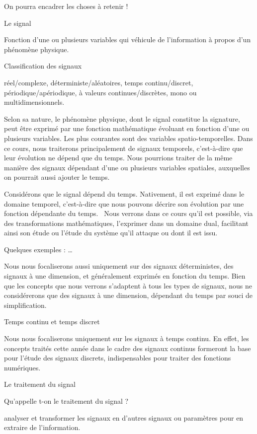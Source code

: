 \documentclass[]{article}
\begin{document}
On pourra encadrer les choses à retenir !

Le signal

Fonction d'une ou plusieurs variables qui véhicule de l'information à
propos d'un phénomène physique.

Classification des signaux~

réel/complexe, déterministe/aléatoires, temps continu/discret,
périodique/apériodique, à valeurs continues/discrètes, mono ou
multidimensionnels.

Selon sa nature, le phénomène physique, dont le signal constitue la
signature, peut être exprimé par une fonction mathématique évoluant en
fonction d'une ou plusieurs variables. Les plus courantes sont des
variables spatio-temporelles. Dans ce cours, nous traiterons
principalement de signaux temporels, c'est-à-dire que leur évolution ne
dépend que du temps. Nous pourrions traiter de la même manière des
signaux dépendant d'une ou plusieurs variables spatiales, auxquelles on
pourrait aussi ajouter le temps.

Considérons que le signal dépend du temps. Nativement, il est exprimé
dans le domaine temporel, c'est-à-dire que nous pouvons décrire son
évolution par une fonction dépendante du temps.~ Nous verrons dans ce
cours qu'il est possible, via des transformations mathématiques,
l'exprimer dans un domaine dual, facilitant ainsi son étude ou l'étude
du système qu'il attaque ou dont il est issu.

Quelques exemples : \ldots{}

Nous nous focaliserons aussi uniquement sur des signaux déterministes,
des signaux à une dimension, et généralement exprimés en fonction du
temps. Bien que les concepts que nous verrons s'adaptent à tous les
types de signaux, nous ne considérerons que des signaux à une dimension,
dépendant du temps par souci de simplification.

Temps continu et temps discret

Nous nous focaliserons uniquement sur les signaux à temps continu. En
effet, les concepts traités cette année dans le cadre des signaux
continus formeront la base pour l'étude des signaux discrets,
indispensables pour traiter des fonctions numériques.

Le traitement du signal

Qu'appelle t-on le traitement du signal ?~

analyser et transformer les signaux en d'autres signaux ou paramètres
pour en extraire de l'information.
\end{document}
